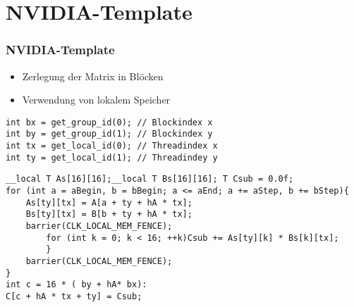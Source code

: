 \documentclass{beamer}
\begin{document}
\section{NVIDIA-Template}
\begin{frame}[fragile]
\frametitle{NVIDIA-Template}

\begin{itemize}
\item
Zerlegung der Matrix in Bl\"ocken
\item
Verwendung von lokalem Speicher 
\end{itemize}

\begin{lstlisting}[style=customc,caption=NVIDIA-Snippet]
int bx = get_group_id(0); // Blockindex x
int by = get_group_id(1); // Blockindex y
int tx = get_local_id(0); // Threadindex x
int ty = get_local_id(1); // Threadindey y
\end{lstlisting}



\end{frame}


\begin{frame}[fragile]
\begin{lstlisting}[style=customc,caption=NVIDIA-Snippet(2)]
__local T As[16][16];__local T Bs[16][16]; T Csub = 0.0f;
for (int a = aBegin, b = bBegin; a <= aEnd; a += aStep, b += bStep){ 
	As[ty][tx] = A[a + ty + hA * tx];
	Bs[ty][tx] = B[b + ty + hA * tx];
	barrier(CLK_LOCAL_MEM_FENCE);
		for (int k = 0; k < 16; ++k)Csub += As[ty][k] * Bs[k][tx];
		}
    barrier(CLK_LOCAL_MEM_FENCE);
}
int c = 16 * ( by + hA* bx):
C[c + hA * tx + ty] = Csub;
\end{lstlisting}


\end{frame}
\end{document}

